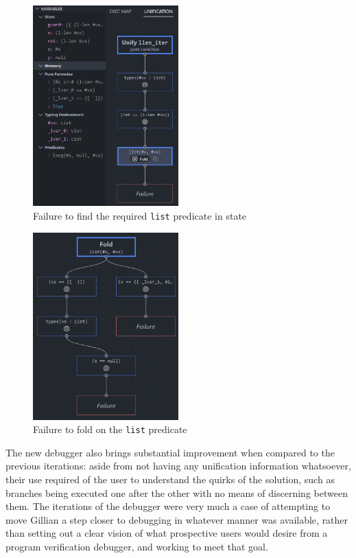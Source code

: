 \begin{figure}
  \centering
  \includegraphics[width=0.5\textwidth]{img/debug-example-unifymap.png}
  \caption{
    Failure to find the required \texttt{list} predicate in state
  }\label{fig:debug-example-unifymap}
\end{figure}

\begin{figure}
  \centering
  \includegraphics[width=0.5\textwidth]{img/debug-example-fold.png}
  \caption{
    Failure to fold on the \texttt{list} predicate
  }\label{fig:debug-example-fold}
\end{figure}

The new debugger also brings substantial improvement when compared to the
previous iterations: aside from not having any unification information
whatsoever, their use required of the user to understand the quirks of the
solution, such as branches being executed one after the other with no means of
discerning between them. The iterations of the debugger were very much a case of
attempting to move Gillian a step closer to debugging in whatever manner was
available, rather than setting out a clear vision of what prospective users
would desire from a program verification debugger, and working to meet that
goal.

